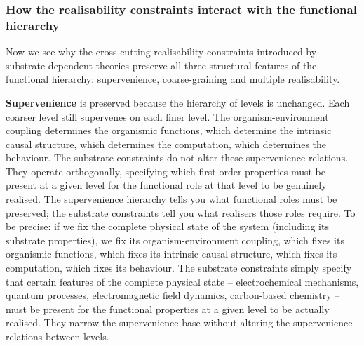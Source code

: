 \documentclass[11pt, a4paper, onecolumn, gdm]{google}
\begin{document}
\subsubsection*{How the realisability constraints interact with the functional hierarchy}\label{how-the-realisability-constraints-interact-with-the-functional-hierarchy}

Now we see why the cross-cutting realisability constraints introduced by substrate-dependent theories preserve all three structural features of the functional hierarchy: supervenience, coarse-graining and multiple realisability.

\textbf{Supervenience} is preserved because the hierarchy of levels is unchanged.
Each coarser level still supervenes on each finer level.
The organism-environment coupling determines the organismic functions, which determine the intrinsic causal structure, which determines the computation, which determines the behaviour.
The substrate constraints do not alter these supervenience relations.
They operate orthogonally, specifying which first-order properties must be present at a given level for the functional role at that level to be genuinely realised.
The supervenience hierarchy tells you what functional roles must be preserved; the substrate constraints tell you what realisers those roles require.
To be precise: if we fix the complete physical state of the system (including its substrate properties), we fix its organism-environment coupling, which fixes its organismic functions, which fixes its intrinsic causal structure, which fixes its computation, which fixes its behaviour.
The substrate constraints simply specify that certain features of the complete physical state -- electrochemical mechanisms, quantum processes, electromagnetic field dynamics, carbon-based chemistry -- must be present for the functional properties at a given level to be actually realised.
They narrow the supervenience base without altering the supervenience relations between levels.
\end{document}

